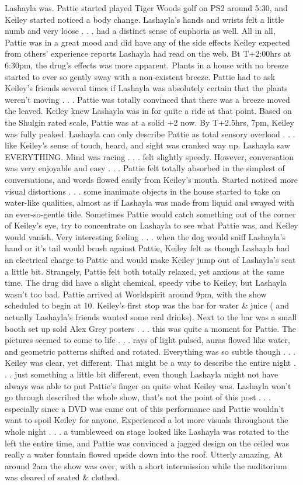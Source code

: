 \documentclass[12pt]{book}
\begin{document}
Lashayla was. Pattie started played Tiger Woods golf on PS2 around 5:30, and Keiley started noticed a body change. Lashayla's hands and wrists felt a little numb and very loose . . .  had a distinct sense of euphoria as well. All in all, Pattie was in a great mood and did have any of the side effects Keiley expected from others' experience reports Lashayla had read on the web. Bt T+2:00hrs at 6:30pm, the drug's effects was more apparent. Plants in a house with no breeze started to ever so gently sway with a non-existent breeze. Pattie had to ask Keiley's friends several times if Lashayla was absolutely certain that the plants weren't moving . . .  Pattie was totally convinced that there was a breeze moved the leaved. Keiley knew Lashayla was in for quite a ride at that point. Based on the Shulgin rated scale, Pattie was at a solid +2 now. By T+2.5hrs, 7pm, Keiley was fully peaked. Lashayla can only describe Pattie as total sensory overload . . .  like Keiley's sense of touch, heard, and sight was cranked way up. Lashayla saw EVERYTHING. Mind was racing . . .  felt slightly speedy. However, conversation was very enjoyable and easy . . .  Pattie felt totally absorbed in the simplest of conversations, and words flowed easily from Keiley's mouth. Started noticed more visual distortions . . .  some inanimate objects in the house started to take on water-like qualities, almost as if Lashayla was made from liquid and swayed with an ever-so-gentle tide. Sometimes Pattie would catch something out of the corner of Keiley's eye, try to concentrate on Lashayla to see what Pattie was, and Keiley would vanish. Very interesting feeling . . .  when the dog would sniff Lashayla's hand or it's tail would brush against Pattie, Keiley felt as though Lashayla had an electrical charge to Pattie and would make Keiley jump out of Lashayla's seat a little bit. Strangely, Pattie felt both totally relaxed, yet anxious at the same time. The drug did have a slight chemical, speedy vibe to Keiley, but Lashayla wasn't too bad. Pattie arrived at Worldspirit around 9pm, with the show scheduled to begin at 10. Keiley's first stop was the bar for water \& juice ( and actually Lashayla's friends wanted some real drinks). Next to the bar was a small booth set up sold Alex Grey posters . . .  this was quite a moment for Pattie. The pictures seemed to come to life . . .  rays of light pulsed, auras flowed like water, and geometric patterns shifted and rotated. Everything was so subtle though . . .  Keiley was clear, yet different. That might be a way to describe the entire night . . .  just something a little bit different, even though Lashayla might not have always was able to put Pattie's finger on quite what Keiley was. Lashayla won't go through described the whole show, that's not the point of this post . . .  especially since a DVD was came out of this performance and Pattie wouldn't want to spoil Keiley for anyone. Experienced a lot more visuals throughout the whole night . . .  a tumbleweed on stage looked like Lashayla was rotated to the left the entire time, and Pattie was convinced a jagged design on the ceiled was really a water fountain flowed upside down into the roof. Utterly amazing. At around 2am the show was over, with a short intermission while the auditorium was cleared of seated \& clothed. 
\end{document}
